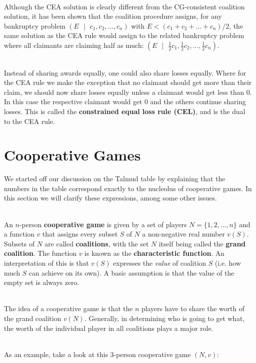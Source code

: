 \documentclass[12pt]{article}
\begin{document}
\noindent
\\
Although the CEA solution is clearly different from the CG-consistent coalition solution, it has been shown that the coalition procedure assigns, for any bankruptcy problem $(E \text{ } | \text{ } c_1, c_2, ... , c_n)$ with $E < (c_1 + c_2 + ... + c_n)/2$, the same solution as the CEA rule would assign to the related bankruptcy problem where all claimants are claiming half as much: $(E \text{ } | \text{ } \frac{1}{2}c_1, \frac{1}{2}c_2, ... , \frac{1}{2}c_n)$.

\noindent
\\
Instead of sharing awards equally, one could also share losses equally.
Where for the CEA rule we make the exception that no claimant should get more than their claim, we should now share losses equally unless a claimant would get less than 0.
In this case the respective claimant would get 0 and the others continue sharing losses.
This is called the \textbf{constrained equal loss rule (CEL)}, and is the dual to the CEA rule.

%
%
\newpage
\section{Cooperative Games}
We started off our discussion on the Talmud table by explaining that the numbers in the table correspond exactly to the nucleolus of cooperative games.
In this section we will clarify these expressions, among some other issues.

\noindent
\\
An $n$-person \textbf{cooperative game} is given by a set of players $N = \{1, 2, ... , n\}$ and a function $v$ that assigns every subset $S$ of $N$ a non-negative real number $v(S)$.
Subsets of $N$ are called \textbf{coalitions}, with the set $N$ itself being called the \textbf{grand coalition}.
The function $v$ is known as the \textbf{characteristic function}.
An interpretation of this is that $v(S)$ expresses the \textit{value} of coalition $S$ (i.e. how much $S$ can achieve on its own).
A basic assumption is that the value of the empty set is always zero.

\noindent
\\
The idea of a cooperative game is that the $n$ players have to share the worth of the grand coalition $v(N)$.
Generally, in determining who is going to get what, the worth of the individual player in all coalitions plays a major role.

\noindent
\\
As an example, take a look at this 3-person cooperative game $(N, v)$:
\end{document}
